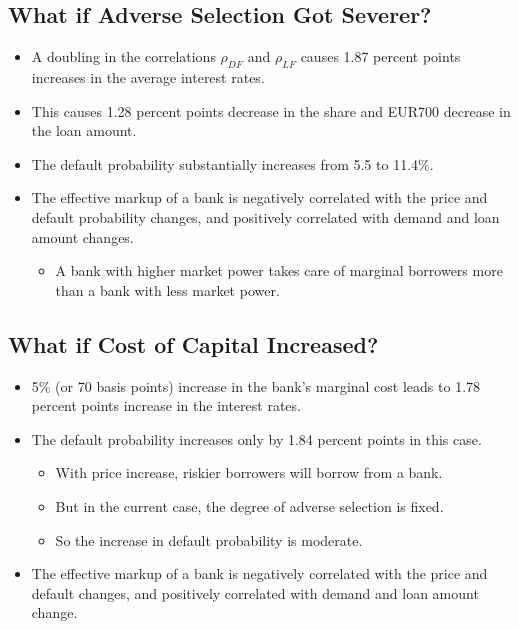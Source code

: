 \documentclass[
]{book}
\providecommand{\tightlist}{%
  \setlength{\itemsep}{0pt}\setlength{\parskip}{0pt}}
\begin{document}
\hypertarget{what-if-adverse-selection-got-severer}{%
\subsection{What if Adverse Selection Got Severer?}\label{what-if-adverse-selection-got-severer}}

\begin{itemize}
\tightlist
\item
  A doubling in the correlations \(\rho_{DF}\) and \(\rho_{LF}\) causes 1.87 percent points increases in the average interest rates.
\item
  This causes 1.28 percent points decrease in the share and EUR700 decrease in the loan amount.
\item
  The default probability substantially increases from 5.5 to 11.4\%.
\item
  The effective markup of a bank is negatively correlated with the price and default probability changes, and positively correlated with demand and loan amount changes.

  \begin{itemize}
  \tightlist
  \item
    A bank with higher market power takes care of marginal borrowers more than a bank with less market power.
  \end{itemize}
\end{itemize}

\hypertarget{what-if-cost-of-capital-increased}{%
\subsection{What if Cost of Capital Increased?}\label{what-if-cost-of-capital-increased}}

\begin{itemize}
\tightlist
\item
  5\% (or 70 basis points) increase in the bank's marginal cost leads to 1.78 percent points increase in the interest rates.
\item
  The default probability increases only by 1.84 percent points in this case.

  \begin{itemize}
  \tightlist
  \item
    With price increase, riskier borrowers will borrow from a bank.
  \item
    But in the current case, the degree of adverse selection is fixed.
  \item
    So the increase in default probability is moderate.
  \end{itemize}
\item
  The effective markup of a bank is negatively correlated with the price and default changes, and positively correlated with demand and loan amount change.
\end{itemize}
\end{document}
